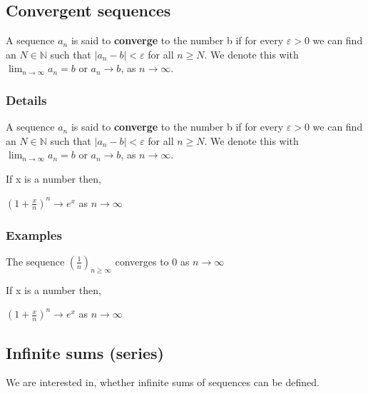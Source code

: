 \documentclass[12pt,a4paper]{article}
\theoremstyle{regla}
\theoremstyle{remark}
\theoremstyle{definition}
\theoremstyle{nonumberbreak}
\begin{document}
\subsection{Convergent sequences}
\begin{fbox}
\begin{minipage}{0.97\textwidth}
A sequence $a_n$ is said to {\bf converge} to the number b if for every $\varepsilon >0$ we can find an $N\in \mathbb{N}$ such that $|a_n-b| < \varepsilon$ for all $n \geq N$. We denote this with $\lim_{n\to\infty}a_n=b$ or $a_n\to b$, as $n\to\infty$.
\end{minipage}
\end{fbox}
\subsubsection{Details}
A sequence $a_n$ is said to {\bf converge} to the number b if for every $\varepsilon >0$ we can find an $N\in \mathbb{N}$ such that $|a_n-b| < \varepsilon$ for all $n \geq N$. We denote this with $\lim_{n\to\infty}a_n=b$ or $a_n\to b$, as $n\to\infty$.


If x is a number then,

$ (1 + \frac{x}{n})^n \rightarrow e^x$ as $n\rightarrow\infty$




\subsubsection{Examples}
\begin{xmpl}

The sequence $(\frac{1}{n})_{n\geq\infty}$ converges to $0$ as $n\to\infty$
\end{xmpl}
\begin{xmpl}

If x is a number then,

$ (1 + \frac{x}{n})^n \rightarrow e^x$ as $n\rightarrow\infty$
\end{xmpl}

\subsection{Infinite sums (series)}
\begin{fbox}
\begin{minipage}{0.97\textwidth}
We are interested in, whether infinite sums of sequences can be defined. \\



\end{minipage}
\end{fbox}
\end{document}
